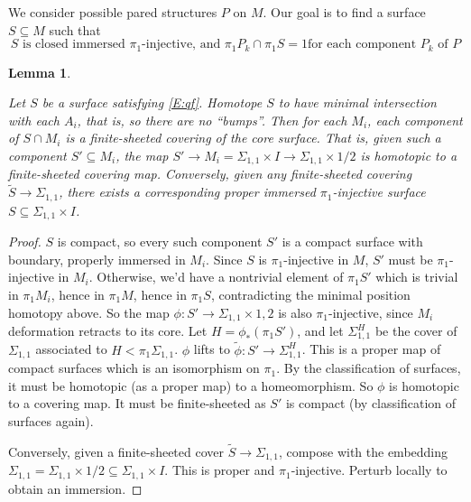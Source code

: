 \documentclass[12pt]{amsart}
\newtheorem{lemma}[theorem]{Lemma}
\theoremstyle{definition}
\theoremstyle{remark}
\newcommand{\x}{\times}
\newcommand{\Si}{\Sigma}
\newcommand{\cin}{\subseteq}
\begin{document}
We consider possible pared structures $P$ on $M$. Our goal is to find
a surface $S \cin M$ such that
\begin{equation}\label{E:qf}
S \text{ is closed immersed $\pi_1$-injective, and  $\pi_1P_k \cap \pi_1S
= 1$
for each component $P_k$ of $P$} \tag{\textasteriskcentered}
\end{equation}

%

\begin{lemma}\label{L:sc}

Let $S$ be a surface satisfying \eqref{E:qf}. Homotope $S$ to have minimal
intersection with each $A_i$, that is, so there are no ``bumps''.  Then for
each $M_i$, each component of $S \cap M_i$ is a finite-sheeted covering of the
core surface.  That is, given such a component $S' \cin M_i$, the map $S' \to
M_i = \Si_{1,1}\x I \to \Si_{1,1}\x{1/2}$ is homotopic to a finite-sheeted
covering map. Conversely, given any finite-sheeted covering $\widetilde{S} \to
\Si_{1,1}$, there exists a corresponding proper immersed $\pi_1$-injective
surface $S \cin \Si_{1,1}\x I$.

\end{lemma}
\begin{proof}

$S$ is compact, so every such component $S'$ is a compact surface with
boundary, properly immersed in $M_i$. Since $S$ is $\pi_1$-injective in $M$,
$S'$ must be $\pi_1$-injective in $M_i$. Otherwise, we'd have a nontrivial
element of $\pi_1S'$ which is trivial in $\pi_1M_i$, hence in $\pi_1M$, hence
in $\pi_1S$, contradicting the minimal position homotopy above. So the map
$\phi : S'\to\Si_{1,1}\x{1,2}$ is also $\pi_1$-injective, since $M_i$
deformation retracts to its core. Let $H = \phi_*(\pi_1S')$, and let
$\Si_{1,1}^H$ be the cover of $\Si_{1,1}$ associated to $H<\pi_1\Si_{1,1}$.
$\phi$ lifts to $\widetilde{\phi}\colon S'\to \Si_{1,1}^H$. This is a proper
map of compact surfaces which is an isomorphism on $\pi_1$.  By the
classification of surfaces, it must be homotopic (as a proper map) to
a homeomorphism. So $\phi$ is homotopic to a covering map. It must be
finite-sheeted as $S'$ is compact (by classification of surfaces again).

Conversely, given a finite-sheeted cover $\widetilde{S}\to \Si_{1,1}$, compose
with the embedding $\Si_{1,1} = \Si_{1,1}\x{1/2} \cin \Si_{1,1}\x I$. This is
proper and $\pi_1$-injective.  Perturb locally to obtain an immersion.

\end{proof}
\end{document}
